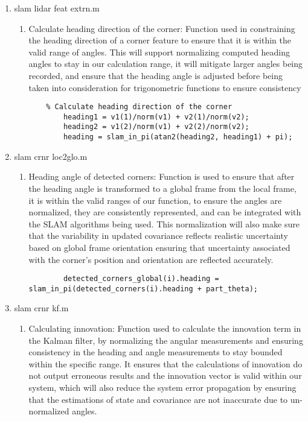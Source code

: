 \begin{enumerate}
\begin{enumerate}
    \end{enumerate}
    \item slam lidar feat extrn.m
    \begin{enumerate}
        \item Calculate heading direction of the corner: Function used in constraining the heading direction of a corner feature to ensure that it is within the valid range of angles. This will support normalizing computed heading angles to stay in our calculation range, it will mitigate larger angles being recorded, and ensure that the heading angle is adjusted before being taken into consideration for trigonometric functions to ensure consistency
        \begin{lstlisting}
	% Calculate heading direction of the corner
        heading1 = v1(1)/norm(v1) + v2(1)/norm(v2);
        heading2 = v1(2)/norm(v1) + v2(2)/norm(v2);
        heading = slam_in_pi(atan2(heading2, heading1) + pi);
        \end{lstlisting}
    \end{enumerate}
    \item slam crnr loc2glo.m
    \begin{enumerate}
        \item Heading angle of detected corners: Function is used to ensure that after the heading angle is transformed to a global frame from the local frame, it is within the valid ranges of our function, to ensure the angles are normalized, they are consistently represented, and can be integrated with the SLAM algorithms being used. This normalization will also make sure that the variability in updated covariance reflects realistic uncertainty based on global frame orientation ensuring that uncertainty associated with the corner's position and orientation are reflected accurately.
        \begin{lstlisting}
        detected_corners_global(i).heading = slam_in_pi(detected_corners(i).heading + part_theta);
        \end{lstlisting}
    \end{enumerate}
    \item slam crnr kf.m
    \begin{enumerate}
        \item Calculating innovation: Function used to calculate the innovation term in the Kalman filter, by normalizing the angular measurements and ensuring consistency in the heading and angle measurements to stay bounded within the specific range. It ensures that the calculations of innovation do not output erroneous results and the innovation vector is valid within our system, which will also reduce the system error propagation by ensuring that the estimations of state and covariance are not inaccurate due to un-normalized angles.

\end{enumerate}
\end{enumerate}
